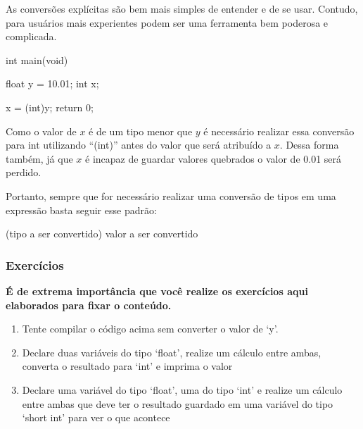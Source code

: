 As conversões explícitas são bem mais simples de entender e de se usar. 
Contudo, para usuários mais experientes podem ser uma ferramenta bem poderosa 
e complicada.

\begin{excode}
    int main(void) {
        float y = 10.01;
        int x;

        x = (int)y;
        return 0;
    }
\end{excode}

Como o valor de \(x\) é de um tipo menor que \(y\) é necessário realizar essa 
conversão para int utilizando ``(int)'' antes do valor que será atribuído a 
\(x\). Dessa forma também, já que \(x\) é incapaz de guardar valores quebrados 
o valor de 0.01 será perdido.

Portanto, sempre que for necessário realizar uma conversão de tipos em uma 
expressão basta seguir esse padrão:

\begin{textbox}
    (tipo a ser convertido) valor a ser convertido
\end{textbox}

\subsubsection{Exercícios}

\textbf{É de extrema importância que você realize os exercícios aqui 
elaborados para fixar o conteúdo.}

\begin{enumerate}
    \item{Tente compilar o código acima sem converter o valor de `y'.}
    \item{Declare duas variáveis do tipo `float', realize um cálculo entre 
        ambas, converta o resultado para `int' e imprima o valor}
    \item{Declare uma variável do tipo `float', uma do tipo `int' e realize um cálculo entre ambas que deve ter o resultado guardado em uma variável do tipo `short int' para ver o que acontece}
\end{enumerate}
